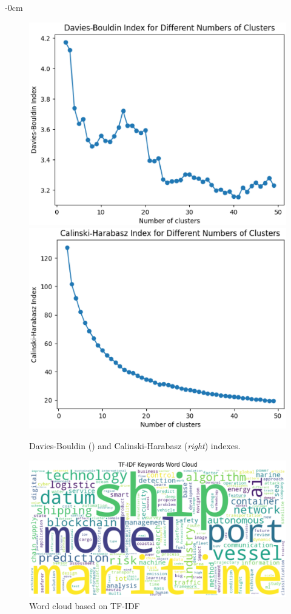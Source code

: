 \documentclass[jmse,review,submit,pdftex,moreauthors]{Definitions/mdpi}
\begin{document}
\begin{adjustwidth}{-\extralength}{0cm}
\begin{figure}[H]
	\centering
	\includegraphics[height=0.2\textheight, keepaspectratio]{pics/davis_bouldin.eps}
	\includegraphics[height=0.2\textheight, keepaspectratio]{pics/calinski.eps}
	\caption{Davies-Bouldin () and Calinski-Harabasz (\textit{right}) indexes.}\label{fig:fig10}
\end{figure}

\begin{figure}[H]
	\centering
	\includegraphics[width=\linewidth]{pics/wordcloud_1.eps}
	\caption{Word cloud based on TF-IDF}\label{fig:fig11}
\end{figure}


\end{adjustwidth}
\end{document}
